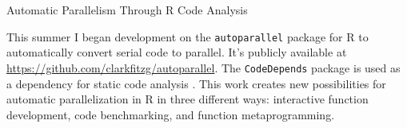 \documentclass[12pt]{article}
\begin{document}
%
%
%
%
%
\begin{center}
    \large Automatic Parallelism Through R Code Analysis 
\end{center}

\hfill

This summer I began development on the \texttt{autoparallel} package for R
to automatically convert serial code to parallel. It's publicly available
at \url{https://github.com/clarkfitzg/autoparallel}. The \texttt{CodeDepends} package is used as a dependency for
static code analysis \cite{R-CodeDepends}. This work creates new
possibilities for automatic parallelization in R in three different ways:
interactive function development, code benchmarking, and function
metaprogramming.
\end{document}
